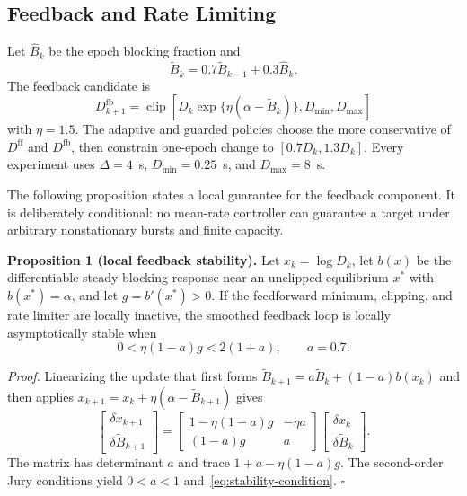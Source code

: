 \documentclass[journal]{IEEEtran}
\begin{document}
\subsection{Feedback and Rate Limiting}

Let $\widehat B_k$ be the epoch blocking fraction and
\begin{equation}
 \widetilde B_k=0.7\widetilde B_{k-1}+0.3\widehat B_k.
\end{equation}
The feedback candidate is
\begin{equation}
 D_{k+1}^{\mathrm{fb}}=\operatorname{clip}\left[
 D_k\exp\{\eta(\alpha-\widetilde B_k)\},D_{\min},D_{\max}\right]
 \label{eq:feedback}
\end{equation}
with $\eta=1.5$. The adaptive and guarded policies choose the more conservative of $D^{\mathrm{ff}}$ and $D^{\mathrm{fb}}$, then constrain one-epoch change to $[0.7D_k,1.3D_k]$. Every experiment uses $\Delta=4$~s, $D_{\min}=0.25$~s, and $D_{\max}=8$~s.

The following proposition states a local guarantee for the feedback component. It is deliberately conditional: no mean-rate controller can guarantee a target under arbitrary nonstationary bursts and finite capacity.

\textbf{Proposition 1 (local feedback stability).} Let $x_k=\log D_k$, let $b(x)$ be the differentiable steady blocking response near an unclipped equilibrium $x^*$ with $b(x^*)=\alpha$, and let $g=b'(x^*)>0$. If the feedforward minimum, clipping, and rate limiter are locally inactive, the smoothed feedback loop is locally asymptotically stable when
\begin{equation}
 0<\eta(1-a)g<2(1+a), \qquad a=0.7.
 \label{eq:stability-condition}
\end{equation}

\emph{Proof.} Linearizing the update that first forms $\widetilde B_{k+1}=a\widetilde B_k+(1-a)b(x_k)$ and then applies $x_{k+1}=x_k+\eta(\alpha-\widetilde B_{k+1})$ gives
\begin{equation}
 \begin{bmatrix}\delta x_{k+1}\\ \delta\widetilde B_{k+1}\end{bmatrix}
 =
 \begin{bmatrix}
 1-\eta(1-a)g & -\eta a\\
 (1-a)g & a
 \end{bmatrix}
 \begin{bmatrix}\delta x_k\\ \delta\widetilde B_k\end{bmatrix}.
\end{equation}
The matrix has determinant $a$ and trace $1+a-\eta(1-a)g$. The second-order Jury conditions yield $0<a<1$ and~\eqref{eq:stability-condition}. \hfill$\square$
\end{document}
